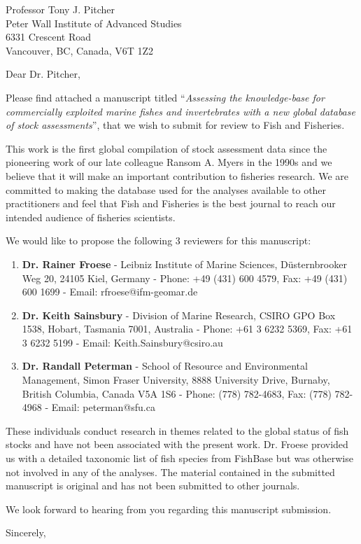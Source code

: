 \documentclass[letterpaper,12pt]{letter}
\begin{document}
\begin{letter}
{Professor Tony J. Pitcher\\Peter Wall Institute of Advanced Studies\\6331 Crescent Road\\Vancouver, BC, Canada, V6T 1Z2}

\opening{Dear Dr. Pitcher,}
Please find attached a manuscript titled ``\textit{Assessing the knowledge-base for commercially exploited marine fishes and invertebrates with a new global database of stock assessments}'', that we wish to submit
for review to Fish and Fisheries.

This work is the first global compilation of stock assessment data
since the pioneering work of our late colleague Ransom A. Myers in the
1990s and we believe that it will make an important contribution to
fisheries research. We are committed to making the database used for
the analyses available to other practitioners and feel that Fish and
Fisheries is the best journal to reach our intended audience of
fisheries scientists.

We would like to propose the following 3 reviewers for this manuscript:

\begin{enumerate}
 \item \textbf{Dr. Rainer Froese} - Leibniz Institute of Marine Sciences, D\"{u}sternbrooker Weg 20, 24105 Kiel, Germany - Phone: +49 (431) 600 4579, Fax: +49 (431) 600 1699 - Email: rfroese@ifm-geomar.de
 \item \textbf{Dr. Keith Sainsbury} - Division of Marine Research, CSIRO GPO Box 1538, Hobart, Tasmania 7001, Australia - Phone: +61 3 6232 5369, Fax: +61 3 6232 5199 - Email: Keith.Sainsbury@csiro.au
 \item \textbf{Dr. Randall Peterman} - School of Resource and Environmental Management, Simon Fraser University, 8888 University Drive, Burnaby, British Columbia, Canada V5A 1S6 - Phone: (778) 782-4683, Fax: (778) 782-4968 - Email: peterman@sfu.ca
\end{enumerate}

These individuals conduct research in themes related to the global
status of fish stocks and have not been associated with the present
work. Dr. Froese provided us with a detailed taxonomic list of fish
species from FishBase but was otherwise not involved in any of the
analyses.  The material contained in the submitted manuscript is
original and has not been submitted to other journals. 

We look forward to hearing from you regarding this manuscript
submission.

\closing{Sincerely,}

\end{letter}
\end{document}
